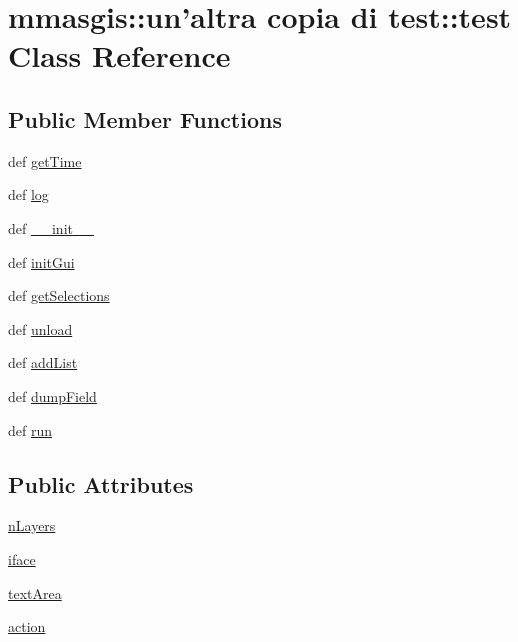 \hypertarget{classmmasgis_1_1un'altra_01copia_01di_01test_1_1test}{
\section{mmasgis::un'altra copia di test::test Class Reference}
\label{classmmasgis_1_1un'altra_01copia_01di_01test_1_1test}
}
\subsection*{Public Member Functions}
\begin{DoxyCompactItemize}
\item 
def \hyperlink{classmmasgis_1_1un'altra_01copia_01di_01test_1_1test_aaba0f619d42f0ba3259f1aa956aae90b}{getTime}
\item 
def \hyperlink{classmmasgis_1_1un'altra_01copia_01di_01test_1_1test_a89b8d321a95bf976681dce07bc07e633}{log}
\item 
def \hyperlink{classmmasgis_1_1un'altra_01copia_01di_01test_1_1test_ac315ed79f46fd1ffb4b82d63ca43e5c1}{\_\-\_\-init\_\-\_\-}
\item 
def \hyperlink{classmmasgis_1_1un'altra_01copia_01di_01test_1_1test_a2f6128582ad47e0928b84647165aebf8}{initGui}
\item 
def \hyperlink{classmmasgis_1_1un'altra_01copia_01di_01test_1_1test_ab344c404d6d22cd3d3dd1cc5fe8d69ca}{getSelections}
\item 
def \hyperlink{classmmasgis_1_1un'altra_01copia_01di_01test_1_1test_ac258684f21618581047b959aceda4e63}{unload}
\item 
def \hyperlink{classmmasgis_1_1un'altra_01copia_01di_01test_1_1test_a1a60e29d6b764703dbe3106585395922}{addList}
\item 
def \hyperlink{classmmasgis_1_1un'altra_01copia_01di_01test_1_1test_a89a1a03247b64dfa88690092b2e989c6}{dumpField}
\item 
def \hyperlink{classmmasgis_1_1un'altra_01copia_01di_01test_1_1test_adfa191c129ba22cda5095e819fbb7c5b}{run}
\end{DoxyCompactItemize}
\subsection*{Public Attributes}
\begin{DoxyCompactItemize}
\item 
\hyperlink{classmmasgis_1_1un'altra_01copia_01di_01test_1_1test_abbe50ff4d6a8e8ed6eab2c639f7ce1d7}{nLayers}
\item 
\hyperlink{classmmasgis_1_1un'altra_01copia_01di_01test_1_1test_a602f010e972d2f95e443b560561ce9cb}{iface}
\item 
\hyperlink{classmmasgis_1_1un'altra_01copia_01di_01test_1_1test_a8786258257e305bc607f36b9db7d1492}{textArea}
\item 
\hyperlink{classmmasgis_1_1un'altra_01copia_01di_01test_1_1test_a1eb8eb10d60f83934f88cf8886c34383}{action}
\end{DoxyCompactItemize}
